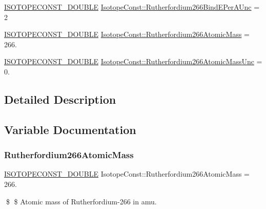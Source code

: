 \begin{DoxyCompactItemize}
\item 
\mbox{\hyperlink{group___isotope_const-_macros_ga8f45a7272ce02c0b4c65c44636ed719a}{I\+S\+O\+T\+O\+P\+E\+C\+O\+N\+S\+T\+\_\+\+D\+O\+U\+B\+LE}} \mbox{\hyperlink{group___isotope_const-_rutherfordium-_rf266_gaebcac93f5f4a4f3d0ea6a9703b766ebf}{Isotope\+Const\+::\+Rutherfordium266\+Bind\+E\+Per\+A\+Unc}} = 2
\item 
\mbox{\hyperlink{group___isotope_const-_macros_ga8f45a7272ce02c0b4c65c44636ed719a}{I\+S\+O\+T\+O\+P\+E\+C\+O\+N\+S\+T\+\_\+\+D\+O\+U\+B\+LE}} \mbox{\hyperlink{group___isotope_const-_rutherfordium-_rf266_ga6b2ee44834a30d59fc1a907b5ab76f38}{Isotope\+Const\+::\+Rutherfordium266\+Atomic\+Mass}} = 266.
\item 
\mbox{\hyperlink{group___isotope_const-_macros_ga8f45a7272ce02c0b4c65c44636ed719a}{I\+S\+O\+T\+O\+P\+E\+C\+O\+N\+S\+T\+\_\+\+D\+O\+U\+B\+LE}} \mbox{\hyperlink{group___isotope_const-_rutherfordium-_rf266_ga4172c9b496c29d8df0402934c078e1c1}{Isotope\+Const\+::\+Rutherfordium266\+Atomic\+Mass\+Unc}} = 0.
\end{DoxyCompactItemize}


\subsection{Detailed Description}


\subsection{Variable Documentation}
\mbox{\label{group___isotope_const-_rutherfordium-_rf266_ga6b2ee44834a30d59fc1a907b5ab76f38}} 
\subsubsection{\texorpdfstring{Rutherfordium266\+Atomic\+Mass}{Rutherfordium266AtomicMass}}
{\footnotesize\ttfamily \mbox{\hyperlink{group___isotope_const-_macros_ga8f45a7272ce02c0b4c65c44636ed719a}{I\+S\+O\+T\+O\+P\+E\+C\+O\+N\+S\+T\+\_\+\+D\+O\+U\+B\+LE}} Isotope\+Const\+::\+Rutherfordium266\+Atomic\+Mass = 266.}

\$ \$ Atomic mass of Rutherfordium-\/266 in amu. \mbox{\label{group___isotope_const-_rutherfordium-_rf266_ga4172c9b496c29d8df0402934c078e1c1}} 
